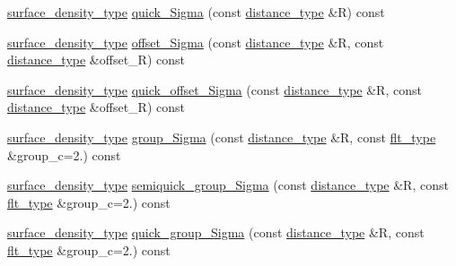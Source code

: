 \begin{DoxyCompactItemize}
\hyperlink{namespaceIceBRG_a80c597ef5ba0a32491d32a9f0083b02d}{surface\+\_\+density\+\_\+type} \hyperlink{classIceBRG_1_1lensing__profile__extension_ab379ef52392e02006be17d63dc9fc143}{quick\+\_\+\+Sigma} (const \hyperlink{namespaceIceBRG_a45499647eb87e24c10ab32c628711cec}{distance\+\_\+type} \&R) const 
\item 
\hyperlink{namespaceIceBRG_a80c597ef5ba0a32491d32a9f0083b02d}{surface\+\_\+density\+\_\+type} \hyperlink{classIceBRG_1_1lensing__profile__extension_a6d741bd28b43b2ac39878dc2330920f8}{offset\+\_\+\+Sigma} (const \hyperlink{namespaceIceBRG_a45499647eb87e24c10ab32c628711cec}{distance\+\_\+type} \&R, const \hyperlink{namespaceIceBRG_a45499647eb87e24c10ab32c628711cec}{distance\+\_\+type} \&offset\+\_\+\+R) const 
\item 
\hyperlink{namespaceIceBRG_a80c597ef5ba0a32491d32a9f0083b02d}{surface\+\_\+density\+\_\+type} \hyperlink{classIceBRG_1_1lensing__profile__extension_ad923f4a13fd5de67e32540e14ccff912}{quick\+\_\+offset\+\_\+\+Sigma} (const \hyperlink{namespaceIceBRG_a45499647eb87e24c10ab32c628711cec}{distance\+\_\+type} \&R, const \hyperlink{namespaceIceBRG_a45499647eb87e24c10ab32c628711cec}{distance\+\_\+type} \&offset\+\_\+\+R) const 
\item 
\hyperlink{namespaceIceBRG_a80c597ef5ba0a32491d32a9f0083b02d}{surface\+\_\+density\+\_\+type} \hyperlink{classIceBRG_1_1lensing__profile__extension_a7a16cb407e28ed4b6969e73c7c47d97d}{group\+\_\+\+Sigma} (const \hyperlink{namespaceIceBRG_a45499647eb87e24c10ab32c628711cec}{distance\+\_\+type} \&R, const \hyperlink{lib_2IceBRG__main_2common_8h_ad0f130a56eeb944d9ef2692ee881ecc4}{flt\+\_\+type} \&group\+\_\+c=2.) const 
\item 
\hyperlink{namespaceIceBRG_a80c597ef5ba0a32491d32a9f0083b02d}{surface\+\_\+density\+\_\+type} \hyperlink{classIceBRG_1_1lensing__profile__extension_acd9166e92f17f86129e9eeecdeba2c95}{semiquick\+\_\+group\+\_\+\+Sigma} (const \hyperlink{namespaceIceBRG_a45499647eb87e24c10ab32c628711cec}{distance\+\_\+type} \&R, const \hyperlink{lib_2IceBRG__main_2common_8h_ad0f130a56eeb944d9ef2692ee881ecc4}{flt\+\_\+type} \&group\+\_\+c=2.) const 
\item 
\hyperlink{namespaceIceBRG_a80c597ef5ba0a32491d32a9f0083b02d}{surface\+\_\+density\+\_\+type} \hyperlink{classIceBRG_1_1lensing__profile__extension_a3a0baaa307aa442681088e7a2e771287}{quick\+\_\+group\+\_\+\+Sigma} (const \hyperlink{namespaceIceBRG_a45499647eb87e24c10ab32c628711cec}{distance\+\_\+type} \&R, const \hyperlink{lib_2IceBRG__main_2common_8h_ad0f130a56eeb944d9ef2692ee881ecc4}{flt\+\_\+type} \&group\+\_\+c=2.) const 

\end{DoxyCompactItemize}
